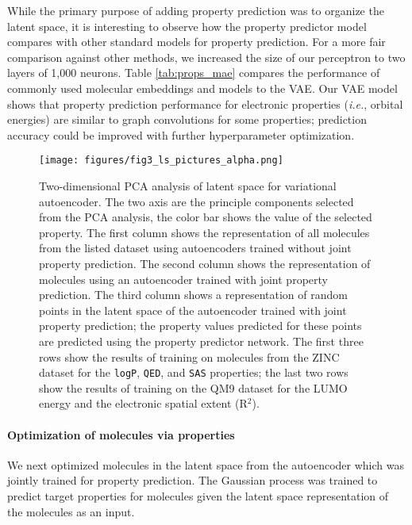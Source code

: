 \documentclass[journal=acscii,manuscript=article]{achemso}
\begin{document}
While the primary purpose of adding property prediction was to organize the latent space, it is interesting to observe how the property predictor model compares with other standard models for property prediction. For a more fair comparison against other methods, we increased the size of our perceptron to two layers of 1,000 neurons. Table \ref{tab:props_mae} compares the performance of commonly used molecular embeddings and models to the VAE. Our VAE model shows that property prediction performance for electronic properties (\textit{i.e.}, orbital energies) are similar to graph convolutions for some properties; prediction accuracy could be improved with further hyperparameter optimization.

\begin{figure}[ht]
    \centering
     \texttt{[image: figures/fig3\_ls\_pictures\_alpha.png]}
    \caption{Two-dimensional PCA analysis of latent space for variational autoencoder. The two axis are the principle components selected from the PCA analysis, the color bar shows the value of the selected property. The first column shows the representation of all molecules from the listed dataset using autoencoders trained without joint property prediction. The second column shows the representation of molecules using an autoencoder trained with joint property prediction. The third column shows a representation of random points in the latent space of the autoencoder trained with joint property prediction; the property values predicted for these points are predicted using the property predictor network. The first three rows show the results of training on molecules from the ZINC dataset for the \texttt{logP}, \texttt{QED}, and \texttt{SAS} properties; the last two rows show the results of training on the QM9 dataset for the LUMO energy and the electronic spatial extent (R$^2$). } \label{fig:ls_figures}
    \vspace{1cm}    
\end{figure}



\paragraph{Optimization of molecules via properties}

We next optimized molecules in the latent space from the autoencoder which was jointly trained for property prediction.  The Gaussian process was trained to predict target properties for molecules given the latent space representation of the molecules as an input.
\end{document}
